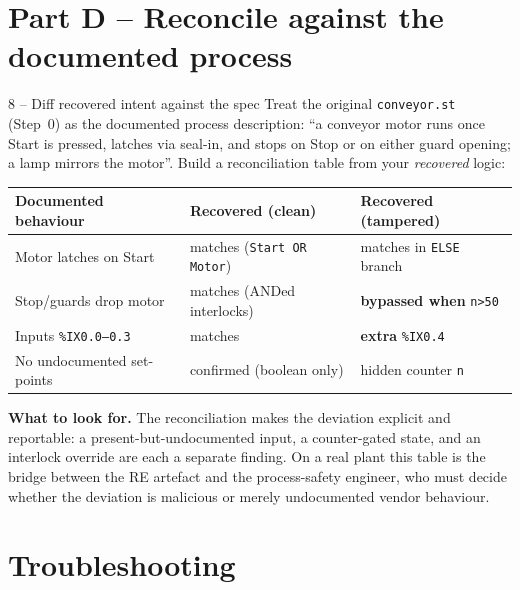 \documentclass[11pt,a4paper]{article}
\begin{document}
\section*{Part D -- Reconcile against the documented process}

\begin{stepbox}{8 -- Diff recovered intent against the spec}
Treat the original \texttt{conveyor.st} (Step~0) as the documented process
description: ``a conveyor motor runs once Start is pressed, latches via
seal-in, and stops on Stop or on either guard opening; a lamp mirrors the
motor''. Build a reconciliation table from your \emph{recovered} logic:
\begin{center}
\footnotesize
\begin{tabular}{@{}p{4.6cm}p{4.4cm}p{4.6cm}@{}}
\toprule
\textbf{Documented behaviour} & \textbf{Recovered (clean)} & \textbf{Recovered (tampered)} \\
\midrule
Motor latches on Start & matches (\texttt{Start OR Motor}) & matches in \texttt{ELSE} branch \\
Stop/guards drop motor & matches (ANDed interlocks) & \textbf{bypassed when } \texttt{n>50} \\
Inputs \texttt{\%IX0.0--0.3} & matches & \textbf{extra} \texttt{\%IX0.4} \\
No undocumented set-points & confirmed (boolean only) & hidden counter \texttt{n} \\
\bottomrule
\end{tabular}
\end{center}
\textbf{What to look for.} The reconciliation makes the deviation
explicit and reportable: a present-but-undocumented input, a
counter-gated state, and an interlock override are each a separate finding.
On a real plant this table is the bridge between the RE artefact and the
process-safety engineer, who must decide whether the deviation is malicious
or merely undocumented vendor behaviour.
\end{stepbox}

\section*{Troubleshooting}
\end{document}
